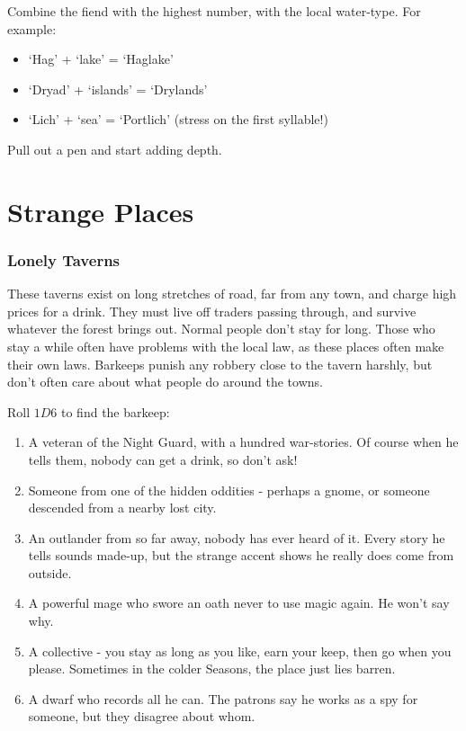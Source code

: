 \begin{multicols}{2}

Combine the fiend with the highest number, with the local water-type.
For example:

\begin{itemize}
\item
  `Hag' + `lake' = `Haglake'
\item
  `Dryad' + `islands' = `Drylands'
\item
  `Lich' + `sea' = `Portlich' (stress on the first syllable!)
\end{itemize}


Pull out a pen and start adding depth.

\end{multicols}

\section{Strange Places}

\begin{multicols}{2}

\subsubsection{Lonely Taverns}
\label{lonelyTaverns}

These taverns exist on long stretches of road, far from any town, and
charge high prices for a drink. They must live off traders passing
through, and survive whatever the forest brings out. Normal people don't
stay for long. Those who stay a while often have problems with the local
law, as these places often make their own laws. Barkeeps punish any
robbery close to the tavern harshly, but don't often care about what
people do around the towns.

Roll $1D6$ to find the barkeep:

\begin{enumerate}
\item
  A veteran of the Night Guard, with a hundred war-stories. Of course
  when he tells them, nobody can get a drink, so don't ask!
\item
  Someone from one of the hidden oddities - perhaps a gnome, or someone
  descended from a nearby lost city.
\item
  An outlander from so far away, nobody has ever heard of it. Every
  story he tells sounds made-up, but the strange accent shows he really
  does come from outside.
\item
  A powerful mage who swore an oath never to use magic again. He won't
  say why.
\item
  A collective - you stay as long as you like, earn your keep, then go
  when you please. Sometimes in the colder Seasons, the place just lies
  barren.
\item
  A dwarf who records all he can. The patrons say he works as a spy for
  someone, but they disagree about whom.
\end{enumerate}

\end{multicols}
